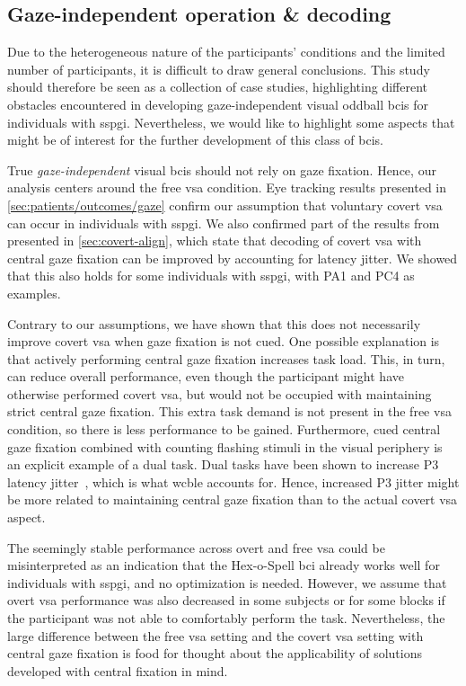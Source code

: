 \documentclass[twocolumn]{article}
\begin{document}
\subsection{Gaze-independent operation \& decoding}
Due to the heterogeneous nature of the participants' conditions and the limited
number of participants, it is difficult to draw general conclusions.
This study should therefore be seen as a collection of case studies,
highlighting different obstacles encountered in developing gaze-independent
visual oddball \acp{bci} for individuals with \ac{sspgi}.
Nevertheless, we would like to highlight some aspects that might be
of interest for the further development of this class of \acp{bci}.

True \emph{gaze-independent} visual \acp{bci} should not rely on gaze fixation.
Hence, our analysis centers around the free \ac{vsa} condition.
Eye tracking results presented in \cref{sec:patients/outcomes/gaze}
confirm our assumption that voluntary covert \ac{vsa} can
occur in individuals with \ac{sspgi}.
We also confirmed part of the results from~\textcite{VanDenKerchove2024}
presented in \cref{sec:covert-align}, which state that decoding of covert \ac{vsa} with central gaze
fixation can be improved by accounting for latency jitter. We showed that this
also holds for some individuals with \ac{sspgi}, with PA1 and PC4 as examples.

Contrary to our assumptions, we have shown that this does not
necessarily improve covert \ac{vsa} when gaze fixation is not cued.
One possible explanation is that actively performing central gaze fixation
increases task load.
This, in turn, can reduce overall performance, even though the participant might
have otherwise performed covert \ac{vsa}, but would not be occupied with
maintaining strict central gaze fixation.
This extra task demand is not present in the free \ac{vsa} condition, so
there is less performance to be gained.
Furthermore, cued central gaze fixation combined with counting flashing stimuli
in the visual periphery is an explicit example of a dual task.
Dual tasks have been shown to increase P3 latency
jitter~\cite{Polich2007,Arico2014, VanDenKerchove2024},
which is what \ac{wcble} accounts for.
Hence, increased P3 jitter might be more related to maintaining central gaze fixation
than to the actual covert \ac{vsa} aspect.

The seemingly stable performance across overt and free \ac{vsa} could be
misinterpreted as an indication that the Hex-o-Spell \ac{bci} already works
well for individuals with \ac{sspgi}, and no optimization is
needed.
However, we assume that overt \ac{vsa} performance was also decreased in some
subjects or for some blocks if the participant was not able to comfortably
perform the task.
Nevertheless, the large difference between the free \ac{vsa} setting and the
covert \ac{vsa} setting
with central gaze fixation is food for thought about the applicability of
solutions developed with central fixation in mind.
\end{document}
